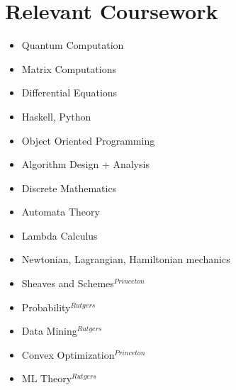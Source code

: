 \section{Relevant Coursework}

\begin{multicols}{3}
\begin{itemize}
\setlength\itemsep{-0.5em}
\item Quantum Computation
\item Matrix Computations
\item Differential Equations
\item Haskell, Python
\item Object Oriented Programming
\item Algorithm Design + Analysis
\item Discrete Mathematics
\item Automata Theory
\item Lambda Calculus
\item Newtonian, Lagrangian, Hamiltonian mechanics
\item Sheaves and Schemes$^{Princeton}$
\item Probability$^{Rutgers}$
\item Data Mining$^{Rutgers}$
\item Convex Optimization$^{Princeton}$
\item ML Theory$^{Rutgers}$
\end{itemize}
\end{multicols}


